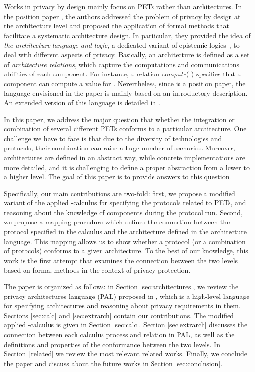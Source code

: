 \documentclass{llncs}
\begin{document}
Works in privacy by design mainly focus on PETs rather than architectures.  
In the position paper \cite{Antignac:2014}, the authors addressed the problem of privacy by design at 
the architecture level and proposed the application of formal methods that facilitate a systematic architecture design. 
In particular, they provided the idea of \textit{the architecture language and logic}, a dedicated variant of epistemic logics~\cite{fagin:2004}, to deal with different aspects of privacy. Basically, an architecture is defined as a set of \textit{architecture relations}, which capture the computations and communications 
abilities of each component. For instance, a relation \textit{compute}(  ) specifies that 
a component  can compute a value  for . 
Nevertheless, since \cite{Antignac:2014} is a position paper, the language envisioned in the paper is 
mainly based on an introductory description. An extended version of this language is detailed in 
\cite{TM-STM2014}. 

In this paper, we address the major question that whether the integration or combination of several 
different PETs conforms to a particular architecture. One challenge we have to face is that due 
to the diversity of technologies and protocols, their combination can raise a huge number of 
scenarios. Moreover, architectures are defined in an abstract way, while concrete 
implementations are more detailed, and it is challenging to define a proper abstraction 
from a lower to a higher level. The goal of this paper is to provide answers to this question.  

Specifically, our main contributions are two-fold: first, we propose a modified variant of 
the applied -calculus \cite{fournet01mobile} for specifying the protocols related to PETs, 
and reasoning about the knowledge of components during the protocol run. Second, we propose a 
mapping procedure which defines the connection between the protocol specified in the calculus and 
the architecture defined in the architecture language. This mapping allows us to show whether a 
protocol (or a combination of protocols) conforms to a given architecture. To the best of our 
knowledge, this work is the first attempt that examines the connection between the two levels based 
on formal methods in the context of privacy protection. 

The paper is organized as follows: in Section \ref{sec:architectures}, we review the 
privacy architectures language (PAL) proposed in \cite{TM-STM2014}, which is a high-level language 
for specifying architectures and reasoning about privacy requirements in them. Sections \ref{sec:calc} 
and \ref{sec:extrarch} contain our contributions. The modified 
applied -calculus is given in Section \ref{sec:calc}. Section \ref{sec:extrarch} 
discusses the connection  between each calculus process and relation in PAL, as well as the definitions 
and properties of the conformance between the two levels. In Section~\ref{related} we review the most 
relevant related works.  Finally, we conclude the paper and discuss about the future works in 
Section \ref{sec:conclusion}. 
\end{document}
